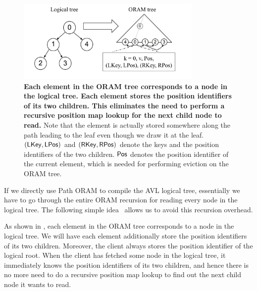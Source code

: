 \documentclass[11pt]{article}
\begin{document}
\begin{figure}[t]
\centering
\includegraphics[width=0.8\textwidth]{ods}
\caption{{\bf Each element in the ORAM tree corresponds to a node 
in the logical tree.  
Each element stores
the position identifiers of its two children. 
This eliminates the need to perform a recursive position map lookup
for the next child node to read.}
Note that the element is actually stored somewhere
along the path leading to the leaf even though we draw it at the leaf.
$({\sf LKey}, {\sf LPos})$
and $({\sf RKey}, {\sf RPos})$
denote the 
keys and the position identifiers of the two children.
${\sf Pos}$ denotes the position identifier
of the current element,  
which is needed for performing eviction on the ORAM tree.
}
\label{fig:ods}
\end{figure}

If we directly use Path ORAM to compile the AVL logical tree, 
essentially we have to go through the entire ORAM recursion for reading
every node in the logical tree. 
The following simple idea~\cite{gentryods,wang2014oblivious} allows
us to avoid this recursion 
overhead. 

As shown in , each element in the ORAM tree
corresponds to a node in the logical tree. 
We will have each element 
additionally store the position identifiers of its two children.
Moreover, the client always
stores the position identifier of the logical root.
When the client has fetched some node 
in the logical tree, it immediately knows
the position identifiers of its two children, and hence there is
no more need to do a recursive position map lookup to find
out the next child node it wants to read.


\end{document}
